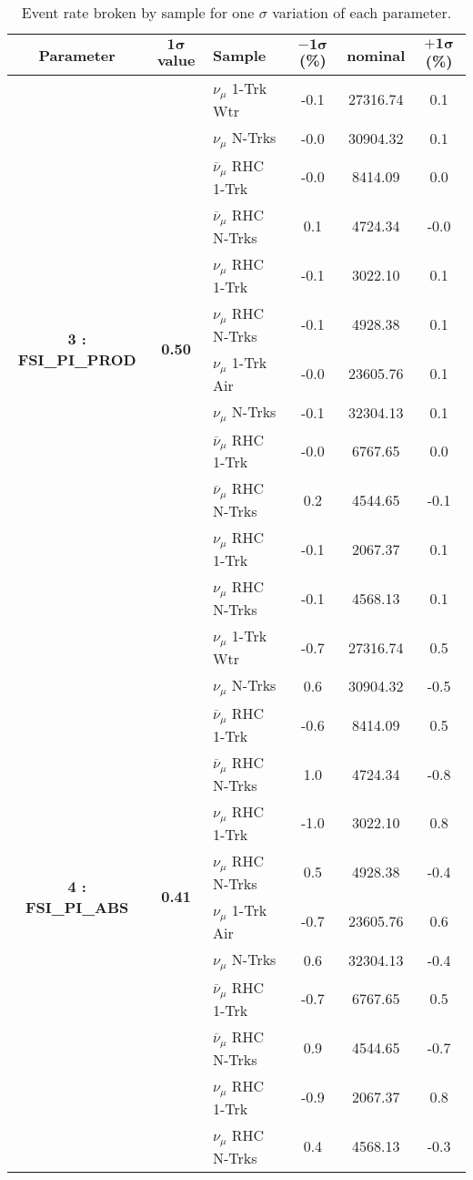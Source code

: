 \addtocounter{table}{-1}
\newpage
\begin{table}[ht!]
\centering
\begin{tabular}{ c  c  l  c  c  c }
\midrule[1.3pt]
\textbf{Parameter} & \textbf{$\mathbf{1\sigma}$ value} & \textbf{Sample} & \textbf{$\mathbf{-1\sigma}$ (\%)}  &  \textbf{nominal}  &  \textbf{$\mathbf{+1\sigma}$ (\%)} \\
\midrule[1.3pt]
\multirow{12}{*}{\textbf{3 : FSI\_PI\_PROD}} & \multirow{12}{*}{\textbf{0.50}} & $\nu_\mu$ 1-Trk Wtr &   -0.1 &  27316.74 &   0.1 \\ 
 &  & $\nu_\mu$ N-Trks &   -0.0 &  30904.32 &   0.1 \\ 
 &  & $\overline{\nu}_\mu$ RHC 1-Trk &   -0.0 &  8414.09 &   0.0 \\ 
 &  & $\overline{\nu}_\mu$ RHC N-Trks &   0.1 &  4724.34 &   -0.0 \\ 
 &  & $\nu_\mu$ RHC 1-Trk &   -0.1 &  3022.10 &   0.1 \\ 
 &  & $\nu_\mu$ RHC N-Trks &   -0.1 &  4928.38 &   0.1 \\ 
 &  & $\nu_\mu$ 1-Trk Air &   -0.0 &  23605.76 &   0.1 \\ 
 &  & $\nu_\mu$ N-Trks &   -0.1 &  32304.13 &   0.1 \\ 
 &  & $\overline{\nu}_\mu$ RHC 1-Trk &   -0.0 &  6767.65 &   0.0 \\ 
 &  & $\overline{\nu}_\mu$ RHC N-Trks &   0.2 &  4544.65 &   -0.1 \\ 
 &  & $\nu_\mu$ RHC 1-Trk &   -0.1 &  2067.37 &   0.1 \\ 
 &  & $\nu_\mu$ RHC N-Trks &   -0.1 &  4568.13 &   0.1 \\ 
\midrule[1.3pt]
\multirow{12}{*}{\textbf{4 : FSI\_PI\_ABS}} & \multirow{12}{*}{\textbf{0.41}} & $\nu_\mu$ 1-Trk Wtr &   -0.7 &  27316.74 &   0.5 \\ 
 &  & $\nu_\mu$ N-Trks &   0.6 &  30904.32 &   -0.5 \\ 
 &  & $\overline{\nu}_\mu$ RHC 1-Trk &   -0.6 &  8414.09 &   0.5 \\ 
 &  & $\overline{\nu}_\mu$ RHC N-Trks &   1.0 &  4724.34 &   -0.8 \\ 
 &  & $\nu_\mu$ RHC 1-Trk &   -1.0 &  3022.10 &   0.8 \\ 
 &  & $\nu_\mu$ RHC N-Trks &   0.5 &  4928.38 &   -0.4 \\ 
 &  & $\nu_\mu$ 1-Trk Air &   -0.7 &  23605.76 &   0.6 \\ 
 &  & $\nu_\mu$ N-Trks &   0.6 &  32304.13 &   -0.4 \\ 
 &  & $\overline{\nu}_\mu$ RHC 1-Trk &   -0.7 &  6767.65 &   0.5 \\ 
 &  & $\overline{\nu}_\mu$ RHC N-Trks &   0.9 &  4544.65 &   -0.7 \\ 
 &  & $\nu_\mu$ RHC 1-Trk &   -0.9 &  2067.37 &   0.8 \\ 
 &  & $\nu_\mu$ RHC N-Trks &   0.4 &  4568.13 &   -0.3 \\ 
\midrule[1.3pt]
\end{tabular}
\centering
\caption{Event rate broken by sample for one $\sigma$ variation of each parameter.}
\end{table}
